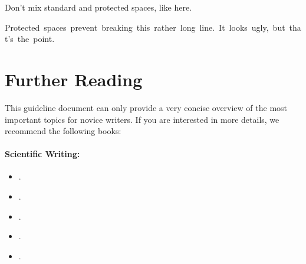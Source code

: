 \documentclass[11pt,a4paper]{article}
\begin{document}
\begin{itemize}
 
 
 \begin{goodexample}
   \begin{NoHyper}
     
   
    \end{NoHyper}
 \end{goodexample}
 \begin{badexample}
   \begin{NoHyper}
    Don't mix standard and protected spaces, like here\badstyle{\textvisiblespace\textvisiblespace}\cite{smith14}.

    {Protected~spaces~prevent~breaking~this~rather~long~line.~It~looks~ugly,~but~that's~the~point.}
   
   \end{NoHyper}
 \end{badexample}

\end{itemize}



\newpage
\vspace{1cm}
\section{Further Reading}
\label{sec-further-reading}
This guideline document can only provide a very concise overview of the most important topics for novice writers.
If you are interested in more details, we recommend the following books:
% 
\paragraph*{Scientific Writing:}
\begin{itemize}
  \item {}.
  \item {}.
  \item {}.
  \item {}.
  \item {}.
\end{itemize}
% 
\end{document}
